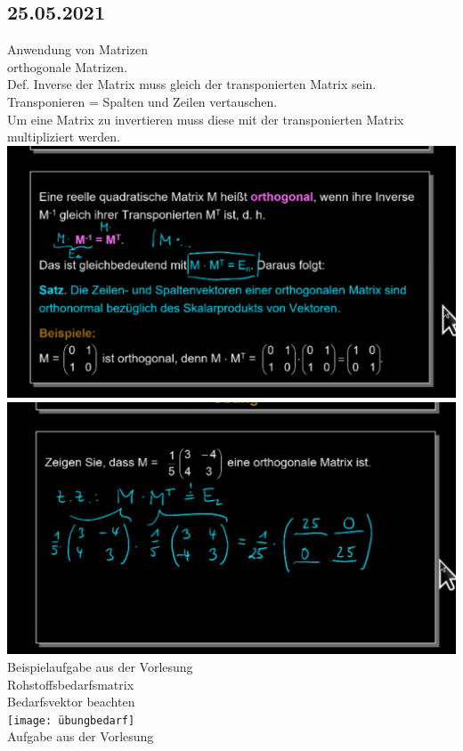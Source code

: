 \documentclass{article}
\begin{document}
	\subsection*{25.05.2021}
	Anwendung von Matrizen \\
	orthogonale Matrizen. \\
	Def. Inverse der Matrix muss gleich der transponierten Matrix sein. \\
	Transponieren = Spalten und Zeilen vertauschen. \\
	Um eine Matrix zu invertieren muss diese mit der transponierten Matrix multipliziert werden. \\
	\includegraphics[width=\linewidth]{tanspo} \\
	\includegraphics[width=\linewidth]{sample2} \\
	Beispielaufgabe aus der Vorlesung  \\
	Rohstoffsbedarfsmatrix \\
	Bedarfsvektor beachten \\
	\texttt{[image: übungbedarf]} \\
	Aufgabe aus der Vorlesung \\
\end{document}
